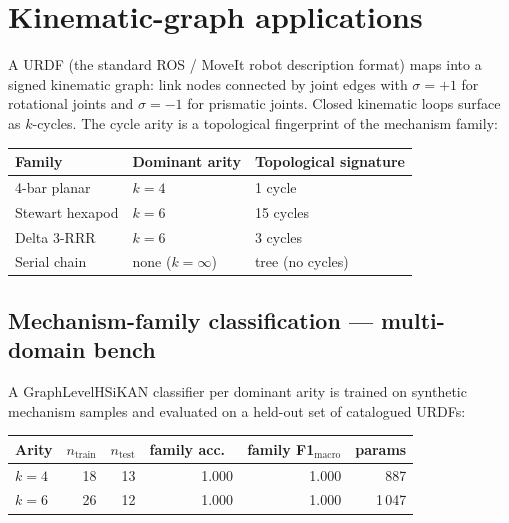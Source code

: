 \documentclass[11pt,a4paper]{article}
\newcommand{\sig}{\ensuremath{\sigma}}
\begin{document}
\section{Kinematic-graph applications}

A URDF (the standard ROS / MoveIt robot description format) maps
into a signed kinematic graph: link nodes connected by joint edges
with $\sig = +1$ for rotational joints and $\sig = -1$ for prismatic
joints. Closed kinematic loops surface as $k$-cycles. The cycle
arity is a topological fingerprint of the mechanism family:

\begin{center}
\begin{tabular}{lll}
\toprule
Family            & Dominant arity     & Topological signature                \\
\midrule
4-bar planar      & $k = 4$            & 1 cycle                              \\
Stewart hexapod   & $k = 6$            & 15 cycles                            \\
Delta 3-RRR       & $k = 6$            & 3 cycles                             \\
Serial chain      & none ($k = \infty$) & tree (no cycles)                    \\
\bottomrule
\end{tabular}
\end{center}

\subsection{Mechanism-family classification --- multi-domain bench}

A GraphLevelHSiKAN classifier per dominant arity is trained on
synthetic mechanism samples and evaluated on a held-out set of
catalogued URDFs:

\begin{center}
\begin{tabular}{lrrrrr}
\toprule
Arity   & $n_\text{train}$ & $n_\text{test}$ & family acc.\ & family F1$_\text{macro}$ & params \\
\midrule
$k = 4$ & 18               & 13              & 1.000        & 1.000                    & 887     \\
$k = 6$ & 26               & 12              & 1.000        & 1.000                    & 1\,047  \\
\bottomrule
\end{tabular}
\end{center}
\end{document}
